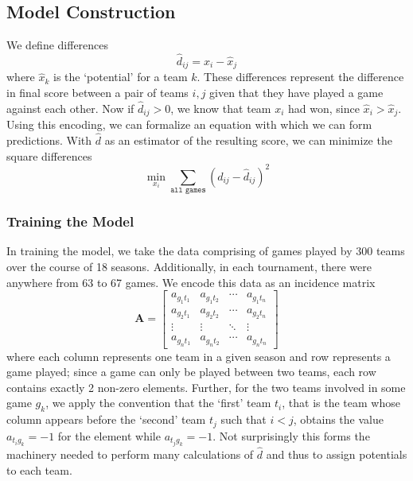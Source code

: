 \documentclass{article} %
\begin{document}
\subsection{Model Construction}
We define differences 
\[
\hat{d}_{ij} = \hat{x}_i - \hat{x}_j
\]
where $\hat{x}_k$ is the `potential' for a team $k$. These differences represent the difference in final score between a pair of teams $i,j$ given that they have played a game against each other. Now if $\hat{d}_{ij} > 0$, we know that team $x_i$ had won, since $\hat{x}_i > \hat{x}_j$. Using this encoding, we can formalize an equation with which we can form predictions. With $\hat{d}$ as an estimator of the resulting score, we can minimize the square differences 
\[
\min_{x_i}\sum_{\texttt{all games}}\left(d_{ij}-\hat{d}_{ij} \right)^2
\]
\subsubsection{Training the Model}
In training the model, we take the data comprising of games played by 300 teams over the course of 18 seasons. Additionally, in each tournament, there were anywhere from 63 to 67 games. We encode this data as an incidence matrix 
\[
\mathbf{A} = \begin{bmatrix}
	a_{g_1t_1} & a_{g_1t_2} & \cdots & a_{g_1t_n}\\
	a_{g_2t_1} & a_{g_2t_2} & \cdots & a_{g_2t_n}\\
	\vdots & \vdots & \ddots & \vdots\\
	a_{g_nt_1} & a_{g_nt_2} & \cdots & a_{g_nt_n}
\end{bmatrix} 
\]
where each column represents one team in a given season and row represents a game played; since a game can only be played between two teams, each row contains exactly 2 non-zero elements. Further, for the two teams involved in some game $g_k$, we apply the convention that the `first' team $t_i$, that is the team whose column appears before the `second' team $t_j$ such that $i<j$, obtains the value $a_{t_ig_k} = -1$ for the element while $a_{t_jg_k} = -1$. Not surprisingly this forms the machinery needed to perform many calculations of $\hat{d}$ and thus to assign potentials to each team.
\end{document}
